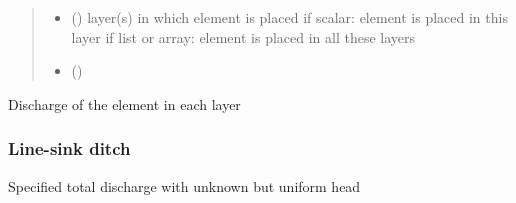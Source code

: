 \documentclass[letterpaper,10pt,english]{sphinxmanual}
\begin{document}
\begin{fulllineitems}
\begin{quote}
\begin{description}
\begin{itemize}
\item {} 
 (\sphinxstyleliteralemphasis{, }) \textendash{} layer(s) in which element is placed
if scalar: element is placed in this layer
if list or array: element is placed in all these layers

\item {} 
 () \textendash{} 

\end{itemize}

\end{description}\end{quote}




{\hyperref[\detokenize{linesinks/headlinesink:timml.linesink.HeadLineSink}]{}}



\begin{fulllineitems}
\label{\detokenize{linesinks/headlinesinkstring:timml.linesink.HeadLineSinkString.discharge}}
Discharge of the element in each layer

\end{fulllineitems}


\end{fulllineitems}



\subsubsection{Line-sink ditch}
\label{\detokenize{linesinks/linesinkditch:line-sink-ditch}}\label{\detokenize{linesinks/linesinkditch::doc}}
Specified total discharge with unknown but uniform head
\end{document}
